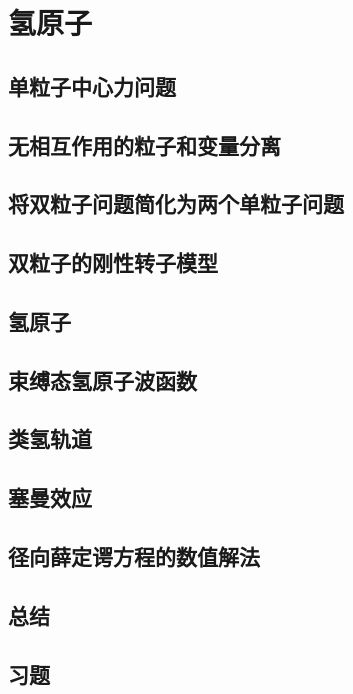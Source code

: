 \chapter{氢原子}
\label{chap:6}
\section{单粒子中心力问题}
\label{sec:6.1 The One-Particle Central Force Problem}

\section{无相互作用的粒子和变量分离}
\label{sec:6.2 Noninteracting Particles and Separation of Variables}

\section{将双粒子问题简化为两个单粒子问题}
\label{sec:6.3 Reduction of the Two-Particle Problem to Two One-Particle Problems}

\section{双粒子的刚性转子模型}
\label{sec:6.4 The Two-Particle Rigid Rotor}

\section{氢原子}
\label{sec:6.5 The Hydrogen Atom}

\section{束缚态氢原子波函数}
\label{sec:6.6 The Bound-State Hydrogen-Atom Wave Functions}

\section{类氢轨道}
\label{sec:6.7 Hydrogenlike orbitals}

\section{塞曼效应}
\label{sec:6.8 Zeeman effect}

\section{径向薛定谔方程的数值解法}
\label{sec:6.9 Numerical Solution of the Radial Schrödinger Equation}

\section*{总结}

\section*{习题}
